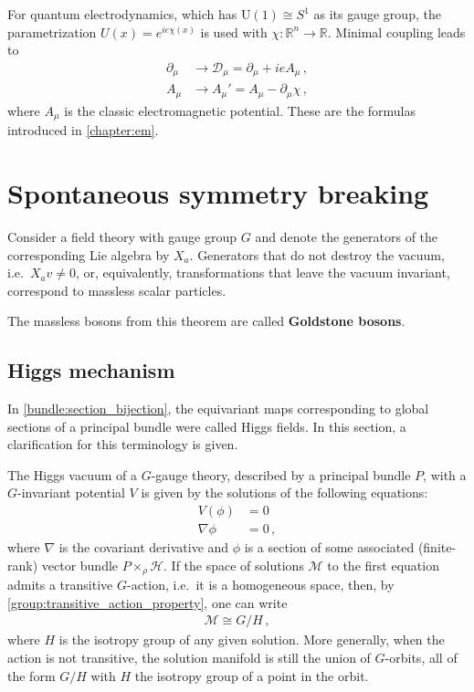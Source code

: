     \begin{example}[QED]
        For quantum electrodynamics, which has $\mathrm{U}(1)\cong S^1$ as its gauge group, the parametrization $U(x)=e^{ie\chi(x)}$ is used with $\chi:\mathbb{R}^n\rightarrow\mathbb{R}$. Minimal coupling leads to
        \begin{align}
            \partial_\mu &\longrightarrow\mathcal{D}_\mu = \partial_\mu + ieA_\mu\,,\\
            A_\mu &\longrightarrow A_\mu' = A_\mu - \partial_\mu\chi\,,
        \end{align}
        where $A_\mu$ is the classic electromagnetic potential. These are the formulas introduced in \cref{chapter:em}.
    \end{example}

\section{Spontaneous symmetry breaking}

    \begin{theorem}[Goldstone]
        Consider a field theory with gauge group $G$ and denote the generators of the corresponding Lie algebra by $X_a$. Generators that do not destroy the vacuum, i.e.~$X_av\neq0$, or, equivalently, transformations that leave the vacuum invariant, correspond to massless scalar particles.
    \end{theorem}
    The massless bosons from this theorem are called \textbf{Goldstone bosons}.

\subsection{Higgs mechanism}\label{section:higgs_mechanism}

    In \cref{bundle:section_bijection}, the equivariant maps corresponding to global sections of a principal bundle were called Higgs fields. In this section, a clarification for this terminology is given.

    The Higgs vacuum of a $G$-gauge theory, described by a principal bundle $P$, with a $G$-invariant potential $V$ is given by the solutions of the following equations:
    \begin{align}
        V(\phi) &= 0\\
        \nabla\phi &= 0\,,
    \end{align}
    where $\nabla$ is the covariant derivative and $\phi$ is a section of some associated (finite-rank) vector bundle $P\times_\rho\mathcal{H}$. If the space of solutions $\mathcal{M}$ to the first equation admits a transitive $G$-action, i.e.~it is a homogeneous space, then, by \cref{group:transitive_action_property}, one can write
    \begin{gather}
        \mathcal{M}\cong G/H\,,
    \end{gather}
    where $H$ is the isotropy group of any given solution. More generally, when the action is not transitive, the solution manifold is still the union of $G$-orbits, all of the form $G/H$ with $H$ the isotropy group of a point in the orbit.

